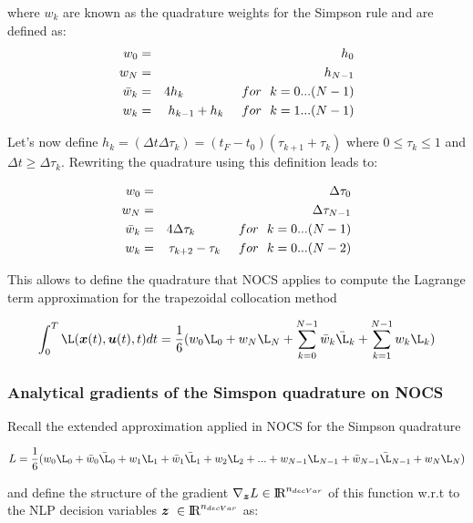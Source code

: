\documentclass[12pt]{article}
\newcommand{\real}{\mbox{\rm I$\!$R}}
\begin{document}
\noindent where $w_k$ are known as the quadrature weights for the Simpson rule and are defined as:
\begin{eqnarray*}
   w_0&=&h_0\\
   w_N&=&h_{N-1}\\
   \bar{w}_k&=&4h_k \hspace{1.6cm}  for \ \ k=0...(N-1)\\
   w_k&=&h_{k-1}+h_k \hspace{0.5cm} for \ \ k=1...(N-1)
\end{eqnarray*}

\noindent Let's now define $h_k=(\Delta t \Delta \tau_k)=(t_F-t_0)(\tau_{k+1}+\tau_{k})$ where $0\leq \tau_k\leq 1$ and $\Delta t \geq \Delta \tau_k $. Rewriting the quadrature using this definition leads to:

\begin{eqnarray*}
   w_0&=&\Delta\tau_0\\
   w_N&=&\Delta\tau_{N-1}\\
   \bar{w}_k&=&4\Delta\tau_k \hspace{1.2cm}  for \ \ k=0...(N-1)\\
   w_k&=&\tau_{k+2}-\tau_k \hspace{0.5cm} for \ \ k=0...(N-2)
\end{eqnarray*}

\noindent This allows to define the quadrature that NOCS applies to compute the Lagrange term approximation for the trapezoidal collocation method

\begin{equation}
   \int_{0}^{T} \L(\bm{x}(t),\bm{u}(t),t) dt= \frac{1}{6}(w_0\L_0+w_{N}\L_{N}+\sum_{k=0}^{N-1} \bar{w}_k\bar{\L}_k+\sum_{k=1}^{N-1} w_k\L_k)
\end{equation}

\subsubsection{Analytical gradients of the Simspon quadrature on NOCS}

Recall the extended approximation applied in NOCS for the Simpson quadrature

\begin{equation}
    L=\frac{1}{6}(w_0\L_0+\bar{w}_0\bar{\L}_0+w_1\L_1+\bar{w}_1\bar{\L}_1+w_2\L_2+ ...+w_{N-1}\L_{N-1}+\bar{w}_{N-1}\bar{\L}_{N-1}+w_N\L_N)
\end{equation}

\noindent and define the structure of the gradient $\nabla_{\bm{z}}L \in \real ^{n_{decVar}}$ of this function w.r.t to the NLP decision variables $\bm{z}\ \in \real^{n_{decVar}}$ as:
\end{document}
